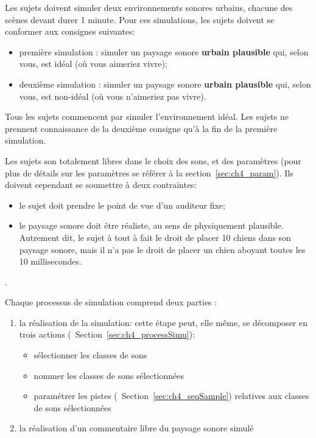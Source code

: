 Les sujets doivent simuler deux environnements sonores urbains, chacune des scènes devant durer 1 minute. Pour ces simulations, les sujets doivent se conformer aux consignes suivantes:

\begin{itemize}
\item première simulation : simuler un paysage sonore \textbf{urbain plausible} qui, selon vous, est idéal (où vous aimeriez vivre);
\item deuxième simulation : simuler un paysage sonore \textbf{urbain plausible} qui, selon vous, est non-idéal (où vous n'aimeriez pas vivre).
\end{itemize}

Tous les sujets commencent par simuler l'environnement idéal. Les sujets ne prennent connaissance de la deuxième consigne qu'à la fin de la première simulation.

Les sujets son totalement libres dans le choix des sons, et des paramètres (pour plus de détails sur les paramètres se référer à la section~\ref{sec:ch4_param}). Ils doivent cependant se soumettre à deux contraintes:

\begin{itemize}
\item le sujet doit prendre le point de vue d’un auditeur fixe;

\item le paysage sonore doit être réaliste, au sens de physiquement plausible. Autrement dit, le sujet à tout à fait le droit de placer 10 chiens dans son paysage sonore, mais il n’a pas le droit de placer un chien aboyant toutes les 10 millisecondes.

\end{itemize}

.

Chaque processus de simulation comprend deux parties :

\begin{enumerate}
\item la réalisation de la simulation: cette étape peut, elle même, se décomposer en trois actions (\cf~Section~\ref{sec:ch4_processSimu}):
\begin{itemize}
\item sélectionner les classes de sons
\item nommer les classes de sons sélectionnées
\item paramétrer les pistes (\cf~Section~\ref{sec:ch4_seqSample}) relatives aux classes de sons sélectionnées
\end{itemize}
\item la réalisation d'un commentaire libre du paysage sonore simulé
\end{enumerate}

